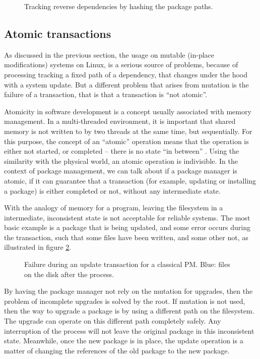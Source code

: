 \begin{figure}[hbtp]
    \centerfloat
    
    \caption{Tracking reverse dependencies by hashing the package paths.}
    \label{fig:nginx_miq}
\end{figure}

\FloatBarrier
\subsection{Atomic transactions}
\label{sec:atomicity}

As discussed in the previous section, the usage on mutable
(in-place modifications) systems on Linux, is a serious
source of problems, because of processing tracking a fixed
path of a dependency, that changes under the hood with a
system update. But a different problem that arises from
mutation is the failure of a transaction, that is that a
transaction is ``not atomic''.

Atomicity in software development is a concept usually
associated with memory management. In a multi-threaded
environment, it is important that shared memory is not
written to by two threads at the same time, but
sequentially. For this purpose, the concept of an ``atomic''
operation means that the operation is either not started, or
completed -- there is no state ``in between''
\cite{neelakantamHardwareAtomicityReliable2007} . Using the
similarity with the physical world, an atomic operation is
indivisible.
In the context of package management, we can talk about if a
package manager is atomic, if it can guarantee that a
transaction (for example, updating or installing a package)
is either completed or not, without any intermediate state.

With the analogy of memory for a program, leaving the
filesystem in a intermediate, inconsistent state is not
acceptable for reliable systems. The most basic example is a
package that is being updated, and some error occurs during
the transaction, such that some files have been written, and
some other not, as illustrated in figure
\ref{fig:atomicity}.


\begin{figure}[hbt]
    \centerfloat
    
    \caption{Failure during an update transaction for a
    classical \ac{PM}. Blue: files on the disk after the process.}
    \label{fig:atomicity}
\end{figure}

By having the package manager not rely on the mutation for
upgrades, then the problem of incomplete upgrades is solved
by the root. If mutation is not used, then the way to
upgrade a package is by using a different path on the
filesystem. The upgrade can operate on this different path
completely safely. Any interruption of the process will not
leave the original package in this inconsistent state.
Meanwhile, once the new package is in place, the update
operation is a matter of changing the references of the old
package to the new package.

